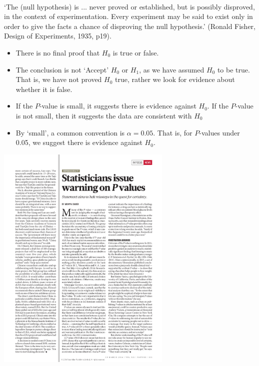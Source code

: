 \documentclass[t,xcolor=pdftex,dvipsnames,table]{beamer}\usepackage[]{graphicx}\usepackage[]{color}
\begin{document}
\begin{frame}[fragile]{}

 \\

‘The (null hypothesis) is ... never proved or established, but is possibly disproved, in the context of experimentation. Every experiment may be said to exist only in order to give the facts a chance of disproving the null hypothesis.’ (Ronald Fisher, Design of Experiments, 1935, p19).

\begin{itemize}
\item There is no final proof that $H_{0}$ is true or false.

\item The conclusion is not `Accept' $H_{0}$ or $H_{1}$, as  we have assumed $H_{0}$ to be true. 
That is, we have not proved $H_{0}$ true, rather we look for evidence about whether it is false.

\item  If the $P$-value is small, it suggests there is evidence against  $H_{0}$. If the $P$-value is not small, then it suggests the data are consistent with $H_{0}$

\item By `small', a common convention is $\alpha = 0.05$. That is, for $P$-values under 0.05, we suggest there is evidence against  $H_{0}$.
\end{itemize}
\end{frame}

\begin{frame}{}

\begin{center}
\includegraphics[height=11cm]{../images/PvaluesNature2016.pdf}
\end{center}
\end{frame}
\end{document}
